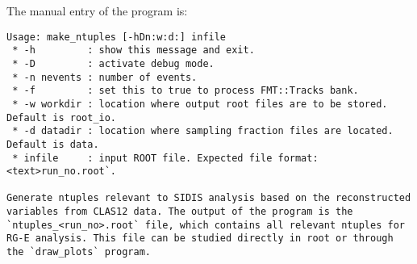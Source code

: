     The manual entry of the program is:
    \begin{lstlisting}
Usage: make_ntuples [-hDn:w:d:] infile
 * -h         : show this message and exit.
 * -D         : activate debug mode.
 * -n nevents : number of events.
 * -f         : set this to true to process FMT::Tracks bank.
 * -w workdir : location where output root files are to be stored. Default is root_io.
 * -d datadir : location where sampling fraction files are located. Default is data.
 * infile     : input ROOT file. Expected file format: <text>run_no.root`.

Generate ntuples relevant to SIDIS analysis based on the reconstructed variables from CLAS12 data. The output of the program is the `ntuples_<run_no>.root` file, which contains all relevant ntuples for RG-E analysis. This file can be studied directly in root or through the `draw_plots` program.
    \end{lstlisting}
